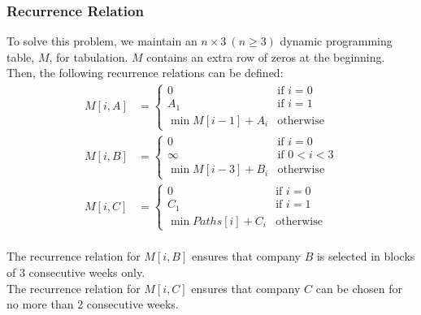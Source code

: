 \documentclass[12pt]{report}
\begin{document}
    \subsubsection*{Recurrence Relation}
    To solve this problem, we maintain an $n \times 3 \ (n \ge 3)$ dynamic programming table, $M$, for tabulation.
    $M$ contains an extra row of zeros at the beginning. \\
    Then, the following recurrence relations can be defined:
    \begin{align}
        M[i, A] &= \begin{cases}
            0 & \text{if } i = 0 \\
            A_{1} & \text{if } i = 1 \\
            \min{M[i-1]} + A_{i} & \text{otherwise}
        \end{cases} \\
        M[i, B] &= \begin{cases}
            0 & \text{if } i = 0 \\
            \infty & \text{if } 0 < i < 3 \\
            \min{M[i-3]} + B_{i} & \text{otherwise}
        \end{cases} \\
        M[i, C] &= \begin{cases}
            0 & \text{if } i = 0 \\
            C_{1} & \text{if } i = 1 \\
            \min{Paths[i]} + C_{i} & \text{otherwise}
        \end{cases}
    \end{align}
    \vspace*{7.5pt} \\
    The recurrence relation for $M[i, B]$ ensures that company $B$ is selected in blocks of 3 consecutive weeks only. \\
    The recurrence relation for $M[i, C]$ ensures that company $C$ can be chosen for no more than 2 consecutive weeks.
\end{document}
